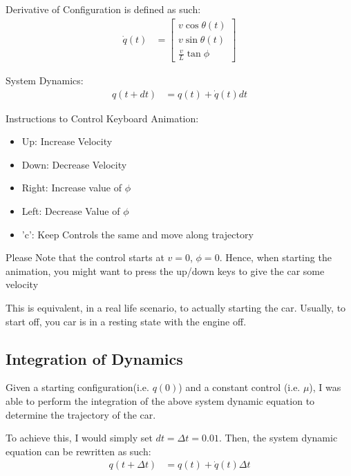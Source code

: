 \documentclass{article}
\begin{document}
Derivative of Configuration is defined as such: \newline 
\begin{align}
    \dot{q}(t) &= \begin{bmatrix}
           v\cos{\theta(t)} \\
           v\sin{\theta(t)} \\
           \frac{v}{L} \tan{\phi}
         \end{bmatrix}
\end{align}

System Dynamics: \newline 
\begin{align}
    q(t + dt) &= q(t) + \dot{q}(t) dt
\end{align}

Instructions to Control Keyboard Animation: \newline 

\begin{itemize}
    \item Up: Increase Velocity
    \item Down: Decrease Velocity
    \item Right: Increase value of $\phi$
    \item Left: Decrease Value of $\phi$
    \item 'c': Keep Controls the same and move along trajectory
\end{itemize}

Please Note that the control starts at $v = 0$, $\phi = 0$. Hence, when starting the animation, you might want to press the up/down keys to give the car some velocity \newline 

This is equivalent, in a real life scenario, to actually starting the car. Usually, to start off, you car is in a resting state with the engine off. \newline 

\subsection{Integration of Dynamics}
Given a starting configuration(i.e. $q(0)$) and a constant control (i.e. $\mu$), I was able to perform the integration of the above system dynamic equation to determine the trajectory of the car. 

To achieve this, I would simply set $dt = \Delta t = 0.01$. Then, the system dynamic equation can be rewritten as such: \newline 
\begin{align}
    q(t + \Delta t) &= q(t) + \dot{q}(t) \Delta t
\end{align}
\end{document}
